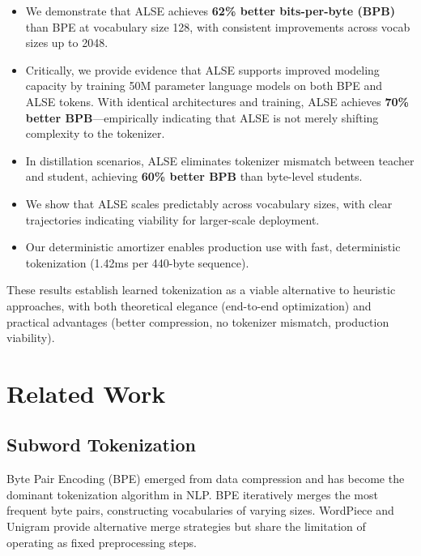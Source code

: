 \documentclass{article}
\begin{document}
\begin{itemize}
    \item We demonstrate that ALSE achieves \textbf{62\% better bits-per-byte (BPB)} than BPE at vocabulary size 128, with consistent improvements across vocab sizes up to 2048.

    \item Critically, we provide evidence that ALSE supports improved modeling capacity by training 50M parameter language models on both BPE and ALSE tokens. With identical architectures and training, ALSE achieves \textbf{70\% better BPB}—empirically indicating that ALSE is not merely shifting complexity to the tokenizer.

    \item In distillation scenarios, ALSE eliminates tokenizer mismatch between teacher and student, achieving \textbf{60\% better BPB} than byte-level students.

    \item We show that ALSE scales predictably across vocabulary sizes, with clear trajectories indicating viability for larger-scale deployment.

    \item Our deterministic amortizer enables production use with fast, deterministic tokenization (1.42ms per 440-byte sequence).
\end{itemize}

These results establish learned tokenization as a viable alternative to heuristic approaches, with both theoretical elegance (end-to-end optimization) and practical advantages (better compression, no tokenizer mismatch, production viability).

\section{Related Work}

\subsection{Subword Tokenization}

Byte Pair Encoding (BPE) \cite{sennrich2016bpe} emerged from data compression and has become the dominant tokenization algorithm in NLP. BPE iteratively merges the most frequent byte pairs, constructing vocabularies of varying sizes. WordPiece \cite{schuster2012wordpiece} and Unigram \cite{kudo2018unigram} provide alternative merge strategies but share the limitation of operating as fixed preprocessing steps.
\end{document}
